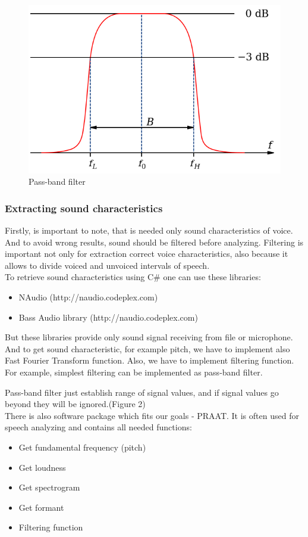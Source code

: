 \documentclass[12pt, letterpaper]{article}
\begin{document}
\begin{figure}
	\centering
		\includegraphics[scale=0.7]{images/pass-band-filter.png}
	\caption{Pass-band filter}
	\label{fig:pass-band-filter}
\end{figure}

\subsubsection{Extracting sound characteristics}

Firstly, is important to note, that is needed only sound characteristics of voice. And to avoid wrong results, sound should be filtered before analyzing. Filtering is important not only for extraction correct voice characteristics, also because it allows to divide voiced and unvoiced intervals of speech.
\\

To retrieve sound characteristics using C\# one can use these libraries:
\begin{itemize}
	\item NAudio (http://naudio.codeplex.com)
	\item Bass Audio library (http://naudio.codeplex.com)
\end{itemize}

But these libraries provide only sound signal receiving from file or microphone. And to get sound characteristic, for example pitch, we have to implement also Fast Fourier Transform function. Also, we have to implement filtering function. For example, simplest filtering can be implemented as pass-band filter. 

Pass-band filter just establish range of signal values, and if signal values go beyond they will be ignored.(Figure 2)
\\
There is also software package which fits our goals - PRAAT. It is often used for speech analyzing and contains all needed functions:
\begin{itemize}
	\item Get fundamental frequency (pitch)
	\item Get loudness
	\item Get spectrogram
	\item Get formant
	\item Filtering function
\end{itemize}
\end{document}
